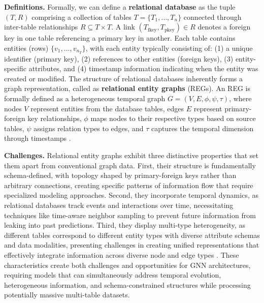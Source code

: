 \documentclass{article} %
\begin{document}
\textbf{Definitions.} Formally, we can define a \textbf{relational database} as the tuple $(T, R)$ comprising a collection of tables $T = \{T_1, \ldots, T_n\}$ connected through inter-table relationships $R \subseteq T \times T$. A link $(T_{\text{fkey}}, T_{\text{pkey}}) \in R$ denotes a foreign key in one table referencing a primary key in another. Each table contains entities (rows) $\{v_1, \ldots, v_{n_T}\}$, with each entity typically consisting of: (1) a unique identifier (primary key), (2) references to other entities (foreign keys), (3) entity-specific attributes, and (4) timestamp information indicating when the entity was created or modified.
The structure of relational databases inherently forms a graph representation, called as \textbf{relational entity graphs} (REGs). 
An REG is formally defined as a heterogeneous temporal graph $G = (V, E, \phi, \psi, \tau)$, where nodes $V$ represent entities from the database tables, edges $E$ represent primary-foreign key relationships, $\phi$ maps nodes to their respective types based on source tables, $\psi$ assigns relation types to edges, and $\tau$ captures the temporal dimension through timestamps \citep{fey2023relational}.

\textbf{Challenges.} Relational entity graphs exhibit three distinctive properties that set them apart from conventional graph data. First, their structure is fundamentally schema-defined, with topology shaped by primary-foreign keys 
rather than arbitrary connections, creating specific patterns of information flow that require specialized modeling approaches. Second, they incorporate temporal dynamics, as relational databases track events and interactions over time, necessitating techniques like time-aware neighbor sampling to prevent future information from leaking into past predictions. Third, they display multi-type heterogeneity, as different tables correspond to different entity types with diverse attribute schemas and data modalities, presenting challenges in creating unified representations that effectively integrate information across diverse node and edge types \citep{schlichtkrull2018modeling, wang2019heterogeneous}. These characteristics create both challenges and opportunities for GNN architectures, requiring models that can simultaneously address temporal evolution, heterogeneous information, and schema-constrained structures while processing potentially massive multi-table datasets.
\end{document}
